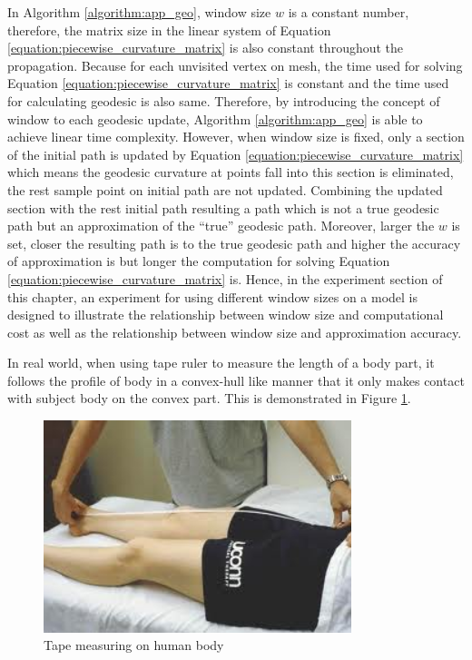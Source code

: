 In Algorithm \ref{algorithm:app_geo}, window size $w$ is a constant number, therefore, the matrix size in the linear system of Equation \ref{equation:piecewise_curvature_matrix} is also constant throughout the propagation. Because for each unvisited vertex on mesh, the time used for solving Equation \ref{equation:piecewise_curvature_matrix} is constant and the time used for calculating geodesic is also same. Therefore, by introducing the concept of window to each geodesic update, Algorithm \ref{algorithm:app_geo} is able to achieve linear time complexity. However, when window size is fixed, only a section of the initial path is updated by Equation \ref{equation:piecewise_curvature_matrix} which means the geodesic curvature at points fall into this section is eliminated, the rest sample point on initial path are not updated. Combining the updated section with the rest initial path resulting a path which is not a true geodesic path but an approximation of the ``true'' geodesic path. Moreover, larger the $w$ is set, closer the resulting path is to the true geodesic path and higher the accuracy of approximation is but longer the computation for solving Equation \ref{equation:piecewise_curvature_matrix} is. Hence, in the experiment section of this chapter, an experiment for using different window sizes on a model is designed to illustrate the relationship between window size and computational cost as well as the relationship between window size and approximation accuracy. 

In real world, when using tape ruler to measure the length of a body part, it follows the profile of body in a convex-hull like manner that it only makes contact with subject body on the convex part. This is demonstrated in Figure \ref{figure:tape_measuring}.

\begin{figure}[H]
	\centering
	\includegraphics[width=0.8\textwidth]{../images/tape_measuring}
	\caption{Tape measuring on human body}
	\label{figure:tape_measuring}
\end{figure}

